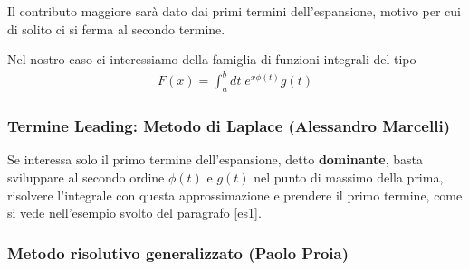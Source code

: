 Il contributo maggiore sarà dato dai primi termini dell'espansione, motivo per cui di solito ci si ferma al secondo termine.

Nel nostro caso ci interessiamo della famiglia di funzioni integrali del tipo
\begin{align}
	F(x) = \int_{a}^{b} dt \; e^{x\phi(t)}g(t) \label{lol0}
\end{align}

\subsubsection{Termine Leading: Metodo di Laplace (Alessandro Marcelli)}

Se interessa solo il primo termine dell'espansione, detto \textbf{dominante}, basta sviluppare al secondo ordine $\phi(t)$ e $g(t)$ nel punto di massimo della prima, risolvere l'integrale con questa approssimazione e prendere il primo termine, come si vede nell'esempio svolto del paragrafo \ref{es1}.

\subsubsection{Metodo risolutivo generalizzato (Paolo Proia)}

